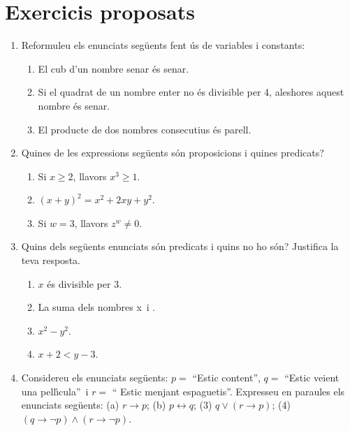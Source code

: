 \chapter{Exercicis proposats}
\label{cap:exercicis}

\begin{enumerate}
\item Reformuleu els enunciats seg\"{u}ents fent \'{u}s de variables i constants:

\begin{enumerate}
\item El cub d'un nombre senar \'{e}s senar.

\item Si el quadrat de un nombre enter no \'{e}s divisible per 4, aleshores
aquest nombre \'{e}s senar.

\item El producte de dos nombres consecutius \'{e}s parell.
\end{enumerate}

\item Quines de les expressions seg\"{u}ents s\'{o}n proposicions i quines predicats?

\begin{enumerate}
\item Si $x\geq2$, llavors $x^{3}\geq1.$

\item $(x+y)^{2}=x^{2}+2xy+y^{2}$.

\item Si $w=3$, llavors $z^{w}\neq0$.
\end{enumerate}

\item Quins dels seg\"{u}ents enunciats s\'{o}n predicats i quins no ho
s\'{o}n? Justifica la teva resposta.\qquad

\begin{enumerate}
\item $x$ \'{e}s divisible per 3.

\item La suma dels nombres \thinspace x\thinspace\ i .

\item $x^{2}-y^{2}$.

\item $x+2<y-3$.
\end{enumerate}

\item Considereu els enunciats seg\"{u}ents: $p=$ \textquotedblleft Estic
content\textquotedblright, $q=$ \textquotedblleft Estic veient una
pel\textperiodcentered l\'{\i}cula\textquotedblright\ i $r=$ \textquotedblleft
Estic menjant espaguetis\textquotedblright. Expresseu en paraules els
enunciats seg\"{u}ents: (a) $r\longrightarrow p$; (b) $p\longleftrightarrow
q$; (3) $q\vee\left(  r\longrightarrow p\right)  $; (4) $\left(
q\longrightarrow\lnot p\right)  \wedge\left(  r\longrightarrow\lnot p\right)
$.


\end{enumerate}
